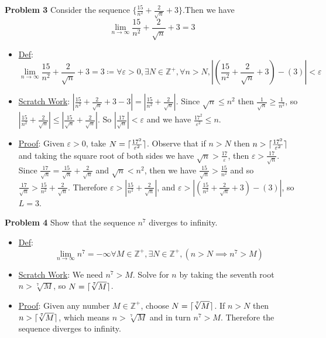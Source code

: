 \documentclass[11pt, oneside]{article}
\newcommand{\Integers}{\mathbb{Z}}
\DeclarePairedDelimiter{\ceil}{\lceil}{\rceil}
\begin{document}
\textbf{Problem 3} Consider the sequence \(\{\frac{15}{n^2} + \frac{2}{\sqrt{n}} + 3\}\).Then we have \[\lim_{n\to \infty}{\frac{15}{n^2} + \frac{2}{\sqrt{n}} + 3} = 3\]

\begin{itemize}

    \item[]\underline{Def}:
          \[\lim_{n\to \infty}{\frac{15}{n^2} + \frac{2}{\sqrt{n}} + 3} = 3 \coloneq \forall \varepsilon > 0, \exists N \in \Integers^+, \forall n > N, |(\frac{15}{n^2} + \frac{2}{\sqrt{n}} + 3) - (3) | < \varepsilon\]
    \item[]\underline{Scratch Work}: \(|\frac{15}{n^2} + \frac{2}{\sqrt{n}} + 3 - 3| = |\frac{15}{n^2} + \frac{2}{\sqrt{n}}|\). Since \(\sqrt{n} \leq n^2\) then \(\frac{1}{\sqrt{n}} \geq \frac{1}{n^2}\), so \( |\frac{15}{n^2} + \frac{2}{\sqrt{n}}| \leq |\frac{15}{\sqrt{n}} + \frac{2}{\sqrt{n}}|\). So \(|\frac{17}{\sqrt{n}}| < \varepsilon\) and we have \(\frac{17^2}{\varepsilon^2} \leq n\).
    \item[]\underline{Proof}:
          Given \(\varepsilon > 0\), take \(N = \ceil{\frac{17^2}{\varepsilon^2}}\).
          Observe that if \(n > N\) then \(n > \ceil{\frac{17^2}{\varepsilon^2}}\) and taking the square root of both sides we have \(\sqrt{n} > \frac{17}{\varepsilon}\), then \(\varepsilon > \frac{17}{\sqrt{n}}\). Since \(\frac{17}{\sqrt{n}} = \frac{15}{\sqrt{n}} + \frac{2}{\sqrt{n}}\) and \(\sqrt{n} < n^2\), then we have \(\frac{15}{\sqrt{n}} > \frac{15}{n^2}\) and so \(\frac{17}{\sqrt{n}} > \frac{15}{n^2} + \frac{2}{\sqrt{n}}\). Therefore \(\varepsilon > |\frac{15}{n^2} + \frac{2}{\sqrt{n}}|\), and \(\varepsilon > |(\frac{15}{n^2} + \frac{2}{\sqrt{n}} + 3) - (3)|\), so \(L = 3\).
\end{itemize}
\vspace{2em}

\textbf{Problem 4} Show that the sequence \(n^7\) diverges to infinity.
\begin{itemize}
    \item[]\underline{Def}: \[\lim_{n\to \infty}{n^7} = -\infty \forall M \in \Integers^+, \exists N \in \Integers^+, (n > N \implies n^7 > M) \]
    \item[]\underline{Scratch Work}: We need \(n^7 > M\). Solve for \(n\) by taking the seventh root \(n > \sqrt[7]{M}\), so \(N = \ceil{\sqrt[7]{M}}\).
    \item[]\underline{Proof}: Given any number \(M \in \Integers^{+}\), choose \(N = \ceil{\sqrt[7]{M}}\). If \(n > N\) then \(n > \ceil{\sqrt[7]{M}}\), which means \(n > \sqrt[7]{M}\) and in turn \(n^7 > M\). Therefore the sequence diverges to infinity.
\end{itemize}
\end{document}
